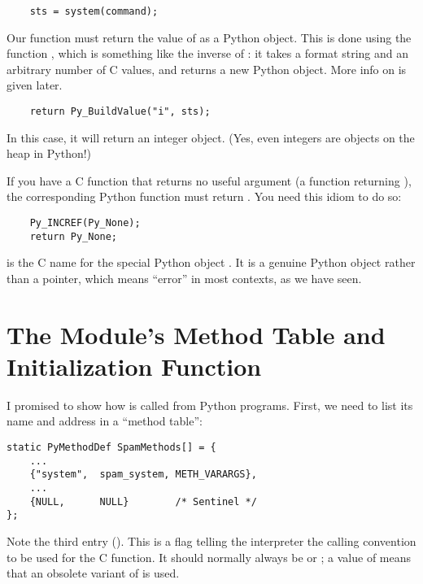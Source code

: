 \documentclass{manual}
\begin{document}
\begin{verbatim}
    sts = system(command);
\end{verbatim}

Our  function must return the value of
 as a Python object.  This is done using the function
, which is something like the inverse of
: it takes a format string and an
arbitrary number of C values, and returns a new Python object.
More info on  is given later.

\begin{verbatim}
    return Py_BuildValue("i", sts);
\end{verbatim}

In this case, it will return an integer object.  (Yes, even integers
are objects on the heap in Python!)

If you have a C function that returns no useful argument (a function
returning ), the corresponding Python function must return
.   You need this idiom to do so:

\begin{verbatim}
    Py_INCREF(Py_None);
    return Py_None;
\end{verbatim}

 is the C name for the special Python object
.  It is a genuine Python object rather than a \NULL{}
pointer, which means ``error'' in most contexts, as we have seen.


\section{The Module's Method Table and Initialization Function
         \label{methodTable}}

I promised to show how  is called from Python
programs.  First, we need to list its name and address in a ``method
table'':

\begin{verbatim}
static PyMethodDef SpamMethods[] = {
    ...
    {"system",  spam_system, METH_VARARGS},
    ...
    {NULL,      NULL}        /* Sentinel */
};
\end{verbatim}

Note the third entry ().  This is a flag telling
the interpreter the calling convention to be used for the C
function.  It should normally always be  or
; a value of  means that an
obsolete variant of  is used.
\end{document}
